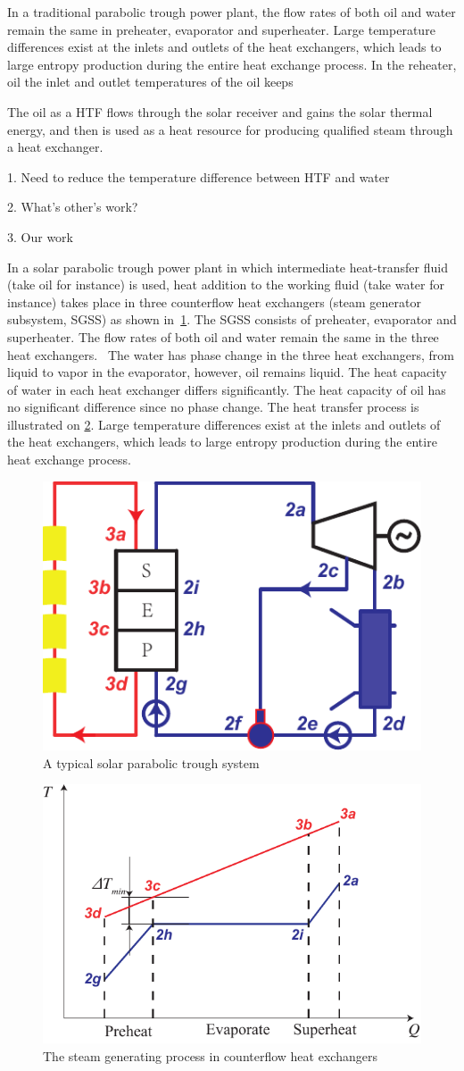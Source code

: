 \documentclass{article}
\begin{document}
In a traditional parabolic trough power plant, the flow rates of both oil and water remain the same in preheater, evaporator and superheater. 
Large temperature differences exist at the inlets and outlets of the heat exchangers, which leads to large entropy production during the entire heat exchange process.
In the reheater, oil 
the inlet and outlet temperatures of the oil keeps 


The oil as a HTF flows through the solar receiver and gains the solar thermal energy, and then is used as a heat resource for producing qualified steam through a heat exchanger.

1. Need to reduce the temperature difference between HTF and water

2. What's other's work?

3. Our work

In a solar parabolic trough power plant in which intermediate heat-transfer fluid (take oil for instance) is used, heat addition to the working fluid (take water for instance) takes place in three counterflow heat exchangers (steam generator subsystem, SGSS) as shown in~\ref{fig:PTC}. The SGSS consists of preheater, evaporator and superheater. The flow rates of both oil and water remain the same in the three heat exchangers.~\cite{Rovira2011}
The water has phase change in the three heat exchangers, from liquid to vapor in the evaporator, however, oil remains liquid. The heat capacity of water in each heat exchanger  differs significantly. The heat capacity of oil has no significant difference since no phase change. The heat transfer process is illustrated on \ref{fig:DeltaTmin}. Large temperature differences exist at the inlets and outlets of the heat exchangers, which leads to large entropy production during the entire heat exchange process.

\begin{figure}[htbp]
\centering
	\includegraphics[width = 0.4\columnwidth]{fig/PTC}
	\caption{A typical solar parabolic trough system}
	\label{fig:PTC}
\end{figure}
\begin{figure}[htbp]
\centering
	\includegraphics[width = 0.5\columnwidth]{fig/DeltaTmin}
	\caption{The steam generating process in counterflow heat exchangers}
	\label{fig:DeltaTmin}
\end{figure}
\end{document}
